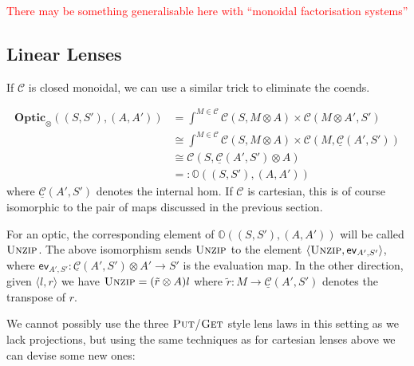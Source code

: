 \documentclass[11pt,a4paper]{article}
\theoremstyle{plain}
\theoremstyle{definition}
\newcommand{\C}{\mathscr{C}}
\newcommand{\homC}{\underline{\C}}
\newcommand{\Optic}{\mathbf{Optic}}
\newcommand{\fget}{\textsc{Get}}
\newcommand{\fput}{\textsc{Put}}
\newcommand{\funzip}{\textsc{Unzip}}
\newcommand{\todo}[1]{\textcolor{red}{\small #1}}
\begin{document}
\todo{There may be something generalisable here with ``monoidal factorisation systems''}

\subsection{Linear Lenses}
\newcommand{\ev}{\mathsf{ev}}
\newcommand{\coev}{\mathsf{coev}}

If $\C$ is closed monoidal, we can use a similar trick to eliminate the coends.

\begin{align*}
\Optic_\otimes((S, S'), (A, A')) &= \int^{M \in \C} \C(S, M \otimes A) \times \C(M \otimes A', S') \\
&\cong \int^{M \in \C} \C(S, M \otimes A) \times \C(M, \homC(A',S')) \\
&\cong \C(S, \homC(A',S') \otimes A) \\
&=: \mathbb{O}((S, S'), (A, A'))
\end{align*}
where $\homC(A', S')$ denotes the internal hom. If $\C$ is cartesian, this is of course isomorphic to the pair of maps discussed in the previous section.

For an optic, the corresponding element of $\mathbb{O}((S, S'), (A, A'))$ will be called $\funzip$. The above isomorphism sends $\funzip$ to the element $\langle \funzip , \ev_{A', S'} \rangle$, where $\ev_{A', S'} : \homC(A',S') \otimes A' \to S'$ is the evaluation map. In the other direction, given $\langle l, r \rangle$ we have $\funzip = (\tilde r \otimes A)l$ where $\tilde r : M \to \homC(A', S')$ denotes the transpose of $r$.

We cannot possibly use the three $\fput$/$\fget$ style lens laws in this setting as we lack projections, but using the same techniques as for cartesian lenses above we can devise some new ones:
\end{document}
